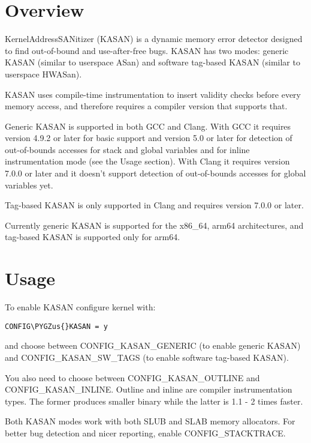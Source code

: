 \documentclass[a4paper,8pt,english]{sphinxmanual}
\def\PYGZus{\char`\_}
\begin{document}
\section{Overview}
\label{dev-tools/kasan:overview}
KernelAddressSANitizer (KASAN) is a dynamic memory error detector designed to
find out-of-bound and use-after-free bugs. KASAN has two modes: generic KASAN
(similar to userspace ASan) and software tag-based KASAN (similar to userspace
HWASan).

KASAN uses compile-time instrumentation to insert validity checks before every
memory access, and therefore requires a compiler version that supports that.

Generic KASAN is supported in both GCC and Clang. With GCC it requires version
4.9.2 or later for basic support and version 5.0 or later for detection of
out-of-bounds accesses for stack and global variables and for inline
instrumentation mode (see the Usage section). With Clang it requires version
7.0.0 or later and it doesn't support detection of out-of-bounds accesses for
global variables yet.

Tag-based KASAN is only supported in Clang and requires version 7.0.0 or later.

Currently generic KASAN is supported for the x86\_64, arm64 architectures,
and tag-based KASAN is supported only for arm64.


\section{Usage}
\label{dev-tools/kasan:usage}
To enable KASAN configure kernel with:

\begin{Verbatim}[commandchars=\\\{\}]
CONFIG\PYGZus{}KASAN = y
\end{Verbatim}

and choose between CONFIG\_KASAN\_GENERIC (to enable generic KASAN) and
CONFIG\_KASAN\_SW\_TAGS (to enable software tag-based KASAN).

You also need to choose between CONFIG\_KASAN\_OUTLINE and CONFIG\_KASAN\_INLINE.
Outline and inline are compiler instrumentation types. The former produces
smaller binary while the latter is 1.1 - 2 times faster.

Both KASAN modes work with both SLUB and SLAB memory allocators.
For better bug detection and nicer reporting, enable CONFIG\_STACKTRACE.
\end{document}
